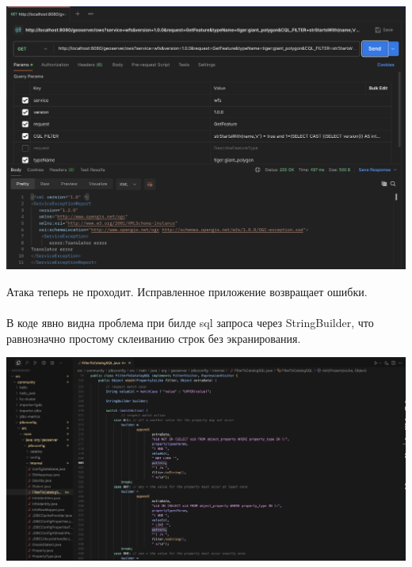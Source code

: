 \documentclass{article}
\begin{document}
\begin{center}
  \includegraphics[width=.7\textwidth]{fix}
\end{center}

Атака теперь не проходит. Исправленное приложение возвращает ошибки.
\\ \\ 
В коде явно видна проблема при билде sql запроса через StringBuilder, что равнозначно простому склеиванию строк без экранирования.
\begin{center}
  \includegraphics[width=.9\textwidth]{code}
\end{center}
\end{document}
